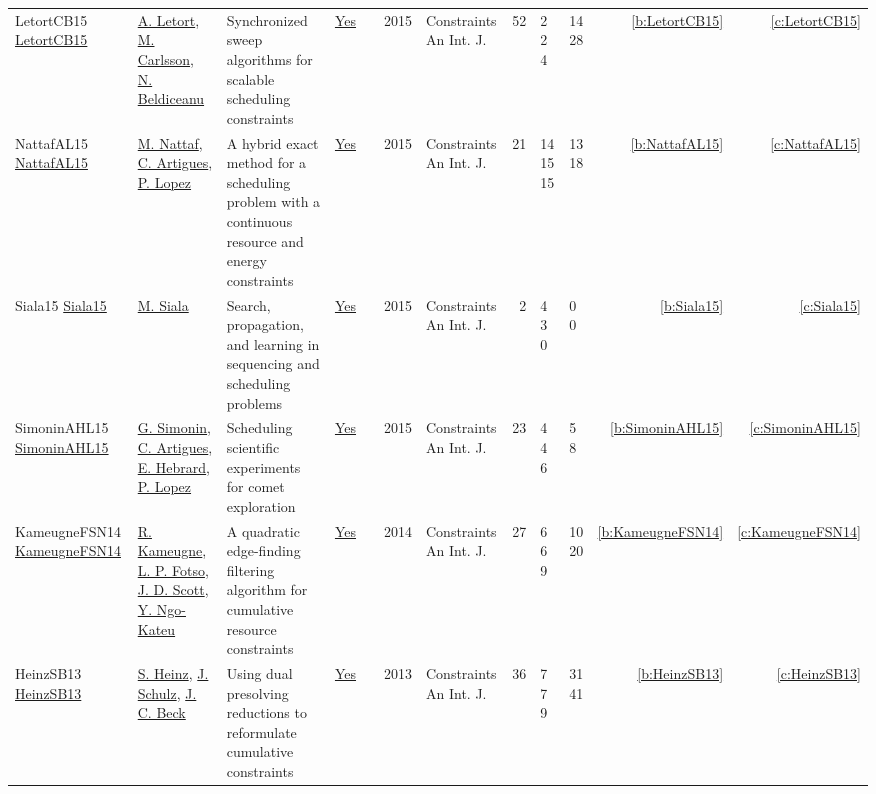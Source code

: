 {\begin{longtable}{>{\raggedright\arraybackslash}p{3cm}>{\raggedright\arraybackslash}p{4.5cm}>{\raggedright\arraybackslash}p{6.0cm}rrrp{2.5cm}rp{1cm}p{1cm}rr}
LetortCB15 \href{https://doi.org/10.1007/s10601-014-9172-8}{LetortCB15} & \hyperref[auth:a127]{A. Letort}, \hyperref[auth:a91]{M. Carlsson}, \hyperref[auth:a128]{N. Beldiceanu} & \cellcolor{green!10}Synchronized sweep algorithms for scalable scheduling constraints & \href{../works/LetortCB15.pdf}{Yes} & \cite{LetortCB15} & 2015 & Constraints An Int. J. & 52 & 2 2 4 & 14 28 & \ref{b:LetortCB15} & \ref{c:LetortCB15}\\
NattafAL15 \href{https://doi.org/10.1007/s10601-015-9192-z}{NattafAL15} & \hyperref[auth:a81]{M. Nattaf}, \hyperref[auth:a6]{C. Artigues}, \hyperref[auth:a3]{P. Lopez} & \cellcolor{green!10}A hybrid exact method for a scheduling problem with a continuous resource and energy constraints & \href{../works/NattafAL15.pdf}{Yes} & \cite{NattafAL15} & 2015 & Constraints An Int. J. & 21 & 14 15 15 & 13 18 & \ref{b:NattafAL15} & \ref{c:NattafAL15}\\
Siala15 \href{https://doi.org/10.1007/s10601-015-9213-y}{Siala15} & \hyperref[auth:a129]{M. Siala} & Search, propagation, and learning in sequencing and scheduling problems & \href{../works/Siala15.pdf}{Yes} & \cite{Siala15} & 2015 & Constraints An Int. J. & 2 & 4 3 0 & 0 0 & \ref{b:Siala15} & \ref{c:Siala15}\\
SimoninAHL15 \href{https://doi.org/10.1007/s10601-014-9169-3}{SimoninAHL15} & \hyperref[auth:a126]{G. Simonin}, \hyperref[auth:a6]{C. Artigues}, \hyperref[auth:a1]{E. Hebrard}, \hyperref[auth:a3]{P. Lopez} & \cellcolor{green!10}Scheduling scientific experiments for comet exploration & \href{../works/SimoninAHL15.pdf}{Yes} & \cite{SimoninAHL15} & 2015 & Constraints An Int. J. & 23 & 4 4 6 & 5 8 & \ref{b:SimoninAHL15} & \ref{c:SimoninAHL15}\\
KameugneFSN14 \href{https://doi.org/10.1007/s10601-013-9157-z}{KameugneFSN14} & \hyperref[auth:a10]{R. Kameugne}, \hyperref[auth:a130]{L. P. Fotso}, \hyperref[auth:a131]{J. D. Scott}, \hyperref[auth:a132]{Y. Ngo-Kateu} & A quadratic edge-finding filtering algorithm for cumulative resource constraints & \href{../works/KameugneFSN14.pdf}{Yes} & \cite{KameugneFSN14} & 2014 & Constraints An Int. J. & 27 & 6 6 9 & 10 20 & \ref{b:KameugneFSN14} & \ref{c:KameugneFSN14}\\
HeinzSB13 \href{https://doi.org/10.1007/s10601-012-9136-9}{HeinzSB13} & \hyperref[auth:a133]{S. Heinz}, \hyperref[auth:a134]{J. Schulz}, \hyperref[auth:a89]{J. C. Beck} & Using dual presolving reductions to reformulate cumulative constraints & \href{../works/HeinzSB13.pdf}{Yes} & \cite{HeinzSB13} & 2013 & Constraints An Int. J. & 36 & 7 7 9 & 31 41 & \ref{b:HeinzSB13} & \ref{c:HeinzSB13}\\

\end{longtable}}

